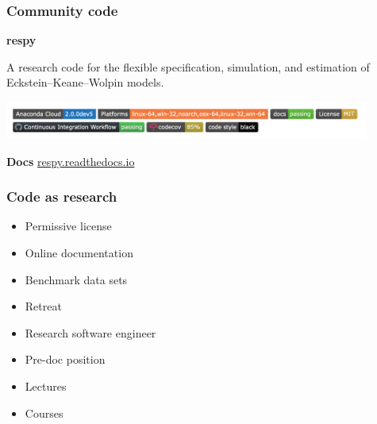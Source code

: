 \begin{frame}\frametitle{Community code}

\vspace{0.3cm}\textbf{\hspace{0.05cm} {\Large respy}}\vspace{0.50cm}

A research code for the flexible specification, simulation, and estimation of Eckstein--Keane--Wolpin models.\\\vspace{0.65cm}

\includegraphics[width=0.9\textwidth]{material/crop-respy-engineering.png}\\\vspace{0.65cm}

\textbf{Docs} \hspace{0.25cm} \url{respy.readthedocs.io}

\end{frame}
\begin{frame}\frametitle{Code as research}


  \begin{multicols}{2}
    \vspace{0.3cm}
    \begin{itemize}\setlength\itemsep{1em}
      \item Permissive license
      \item Online documentation
      \item Benchmark data sets
      \item Retreat
    \end{itemize}

    \pause

    \vspace{0.3cm}
    \begin{itemize}\setlength\itemsep{1em}
      \item Research software engineer
      \item Pre-doc position
      \item Lectures
      \item Courses
  \end{itemize}
  \end{multicols}

\end{frame}
